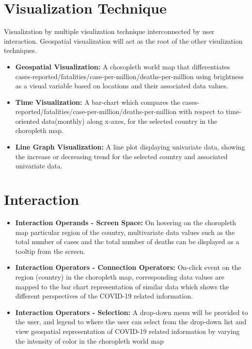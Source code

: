 \documentclass[10pt]{article}
\begin{document}
\section{Visualization Technique}
Visualization by multiple visulization technique interconnected by user interaction. Geospatial visualization will act as the root of the other visulization techniques. 
\begin{itemize}
    \item \textbf{Geospatial Visualization:} A choropleth world map that differentiates cases-reported/fatalities/case-per-million/deaths-per-million using brightness as a visual variable based on locations and their associated data values.
    \item \textbf{Time Visualization:} A bar-chart which compares the cases-reported/fatalities/case-per-million/deaths-per-million with respect to time-oriented data(monthly) along x-axes, for the selected country in the choropleth map. 
     \item \textbf{Line Graph Visualization:} A line plot displaying univariate data, showing the increase or decreasing trend for the selected country and associated univariate data.
\end{itemize}


\section{Interaction}
\begin{itemize}
    \item \textbf{Interaction Operands - Screen Space:} On hovering on the choropleth map particular region of the country,
    multivariate data values such as the total number of cases and the total number of deaths can be displayed as a tooltip from the screen.
    \item \textbf{Interaction Operators - Connection Operators:} On-click event on the region (country) in the choropleth map,
    corresponding data values are mapped to the bar chart representation of similar data which shows the different perspectives of the COVID-19 related information.
    \item \textbf{Interaction Operators - Selection:} A drop-down menu will be provided to the user, and legend to 
    where the user can select from the drop-down list and view geospatial representation of COVID-19 related information by varying the intensity of color in the choropleth world map
\end{itemize}
\end{document}

